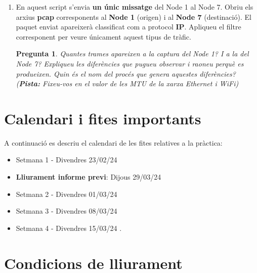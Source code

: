 \documentclass[12pt,a4paper]{article}
\newcounter{exercises}
\newtheorem{exer}[exercises]{Pregunta}
\begin{document}
\begin{enumerate}
\item En aquest script s'envia \textbf{un únic missatge} del Node 1 al Node 7. Obriu els arxius \textbf{pcap} corresponents al \textbf{Node 1} (origen) i al \textbf{Node 7} (destinació). El paquet enviat apareixerà classificat com a protocol \textbf{IP}. Apliqueu el filtre corresponent per veure únicament aquest tipus de tràfic.

\begin{exer} Quantes trames apareixen a la captura del Node 1? I a la del Node 7? Expliqueu les diferències que pugueu observar i raoneu perquè es produeixen. Quin és el nom del procés que genera aquestes diferències? (\textbf{Pista:} Fixeu-vos en el valor de les MTU de la xarxa Ethernet i WiFi) \end{exer}

\end{enumerate}




\section{Calendari i fites importants}

A continuació es descriu el calendari de les fites relatives a la pràctica:
\begin{itemize}
    
    \item Setmana 1 - Divendres 23/02/24
    \item \textbf{Lliurament informe previ}: Dijous 29/03/24
    \item Setmana 2 - Divendres 01/03/24
    \item Setmana 3 - Divendres 08/03/24
    \item Setmana 4 - Divendres 15/03/24    .
\end{itemize}

\section{Condicions de lliurament}
\end{document}
